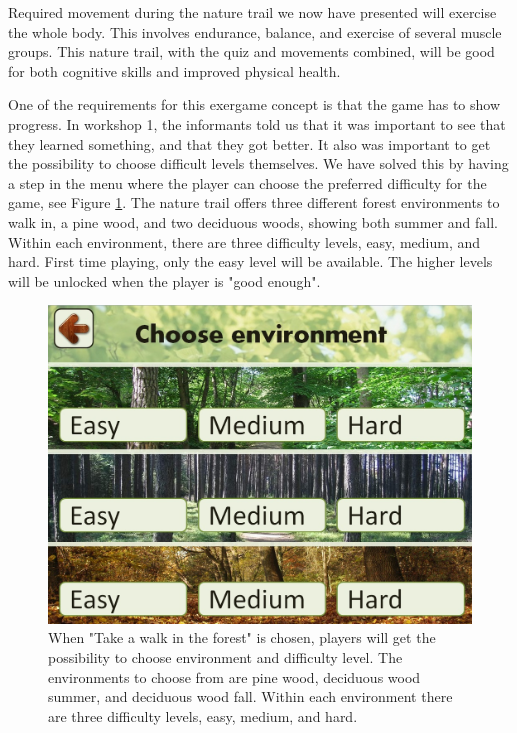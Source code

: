 Required movement during the nature trail we now have presented will exercise the whole body. This involves endurance, balance, and exercise of several muscle groups. This nature trail, with the quiz and movements combined, will be good for both cognitive skills and improved physical health.  

One of the requirements for this exergame concept is that the game has to show progress. In workshop 1, the informants told us that it was important to see that they learned something, and that they got better. It also was important to get the possibility to choose difficult levels themselves. We have solved this by having a step in the menu where the player can choose the preferred difficulty for the game, see Figure \ref{fig:omgivelseNivaa}. The nature trail offers three different forest environments to walk in, a pine wood, and two deciduous woods, showing both summer and fall. Within each environment, there are three difficulty levels, easy, medium, and hard. First time playing, only the easy level will be available. The higher levels will be unlocked when the player is "good enough".   

\begin{figure} [H]
\centering
\includegraphics[scale=0.45]{chooseEnvironment.jpg}
\caption[Choice of environment and difficulty level]{When "Take a walk in the forest" is chosen, players will get the possibility to choose environment and difficulty level. The environments to choose from are pine wood, deciduous wood summer, and deciduous wood fall. Within each environment there are three difficulty levels, easy, medium, and hard.}
\label{fig:omgivelseNivaa}
\end{figure}
     

